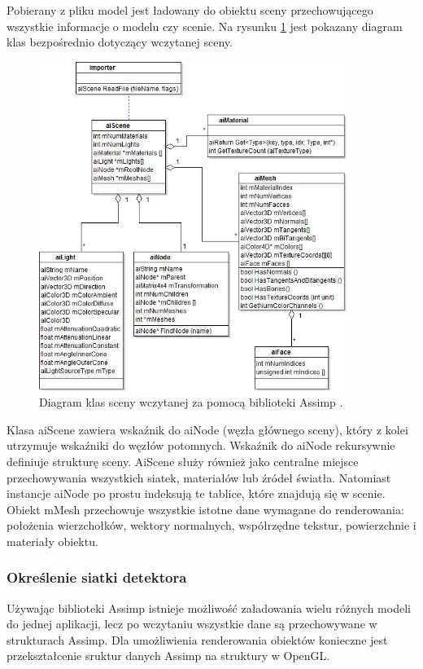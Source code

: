 Pobierany z pliku model jest ładowany do obiektu sceny przechowującego wszystkie informacje o modelu czy scenie. Na rysunku \ref{rys14} jest pokazany diagram klas bezpośrednio dotyczący wczytanej sceny.
\begin{figure}[H]
		\centering
 		\includegraphics[width=10.0cm]{assimpClasses.jpg}
    	\caption{Diagram klas sceny wczytanej za pomocą biblioteki Assimp \cite{assimpImport}.}
 		\label{rys14}
\end{figure}

Klasa aiScene zawiera wskaźnik do aiNode (węzła głównego sceny), który z kolei utrzymuje wskaźniki do węzłów potomnych. Wskaźnik do aiNode rekursywnie definiuje strukturę sceny. AiScene służy również jako centralne miejsce przechowywania wszystkich siatek, materiałów lub źródeł światła. Natomiast instancje aiNode po prostu indeksują te tablice, które znajdują się w scenie. Obiekt mMesh przechowuje wszystkie istotne dane wymagane do renderowania: położenia wierzchołków, wektory normalnych, współrzędne tekstur, powierzchnie i materiały obiektu.

\subsubsection{Określenie siatki detektora}
Używając biblioteki Assimp istnieje możliwość załadowania wielu różnych modeli do jednej aplikacji, lecz po wczytaniu wszystkie dane są przechowywane w strukturach Assimp. Dla umożliwienia renderowania obiektów konieczne jest przekształcenie sruktur danych Assimp na struktury w OpenGL. 

